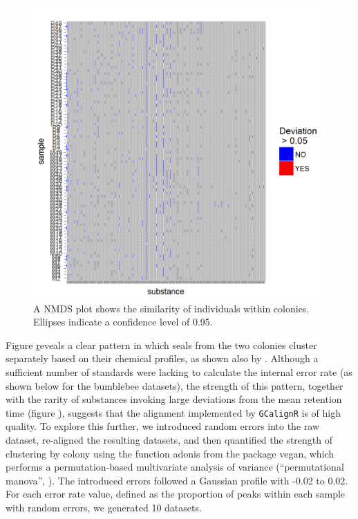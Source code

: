 \begin{figure}[htbp]
\centering
\includegraphics[width=13cm]{figures/ordiplot}
\caption{A NMDS plot shows the similarity of individuals within colonies. Ellipses indicate a confidence level of 0.95.}
\label{figure:ordiplot}
\end{figure}

Figure \href{figure:ordiplot} reveals a clear pattern in which seals
from the two colonies cluster separately based on their chemical
profiles, as shown also by \citet{Stoffel.2015}. Although a sufficient
number of standards were lacking to calculate the internal error rate
(as shown below for the bumblebee datasets), the strength of this
pattern, together with the rarity of substances invoking large
deviations from the mean retention time (figure \href{figure:heatmap}),
suggests that the alignment implemented by \texttt{GCalignR} is of high
quality. To explore this further, we introduced random errors into the
raw dataset, re-aligned the resulting datasets, and then quantified the
strength of clustering by colony using the function adonis from the
package vegan, which performs a permutation-based multivariate analysis
of variance (``permutational manova'', \citep{Anderson.2001}). The
introduced errors followed a Gaussian profile with -0.02 to 0.02. For
each error rate value, defined as the proportion of peaks within each
sample with random errors, we generated 10 datasets.


